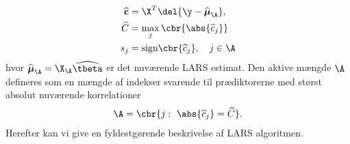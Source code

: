 \begin{align}
\widehat{\mathbf{c}} &= \X^T \del{\y - \widehat{\boldsymbol{\mu}}_\A}, \nonumber \\
\widehat{C} &= \max_j \cbr{\abs{\widehat{c}_j}}  \label{eq:lars_2.8}  \\
s_j &= \text{sign} \cbr{\widehat{c}_j}, \quad j \in \A \nonumber
\end{align}
hvor \(\widehat{\boldsymbol{\mu}}_\A = \X_\A \widehat{\tbeta}\) er det nuværende LARS estimat.
Den aktive mængde \(\A\) defineres som en mængde af indekser svarende til prædiktorerne med størst absolut nuværende korrelationer
\begin{align}
\A= \cbr{j: \ \abs{ \widehat{c}_j} = \widehat{C}}. \label{eq:lars_aktive}
\end{align}
Herefter kan vi give en fyldestgørende beskrivelse af LARS algoritmen.
%

